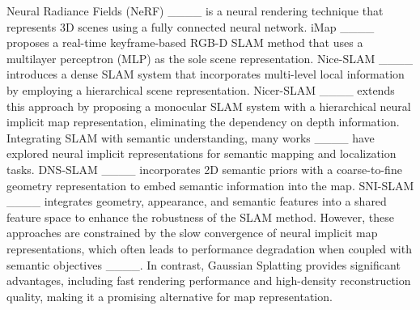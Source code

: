     Neural Radiance Fields (NeRF) ____ is a neural rendering technique that represents 3D scenes using a fully connected neural network.
    iMap ____ proposes a real-time keyframe-based RGB-D SLAM method that uses a multilayer perceptron (MLP) as the sole scene representation.
    Nice-SLAM ____ introduces a dense SLAM system that incorporates multi-level local information by employing a hierarchical scene representation.
    Nicer-SLAM ____ extends this approach by proposing a monocular SLAM system with a hierarchical neural implicit map representation, eliminating the dependency on depth information.
    Integrating SLAM with semantic understanding, many works ____ have explored neural implicit representations for semantic mapping and localization tasks. 
    DNS-SLAM ____ incorporates 2D semantic priors with a coarse-to-fine geometry representation to embed semantic information into the map.
    SNI-SLAM ____ integrates geometry, appearance, and semantic features into a shared feature space to enhance the robustness of the SLAM method.
    However, these approaches are constrained by the slow convergence of neural implicit map representations, which often leads to performance degradation when coupled with semantic objectives ____. 
    In contrast, Gaussian Splatting provides significant advantages, including fast rendering performance and high-density reconstruction quality, making it a promising alternative for map representation.

    


